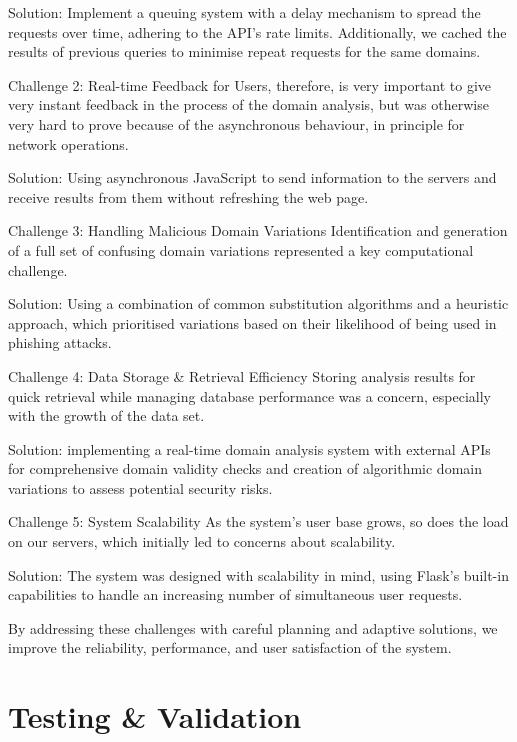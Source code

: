 Solution: Implement a queuing system with a delay mechanism to spread the requests over time, adhering to the API's rate limits. Additionally, we cached the results of previous queries to minimise repeat requests for the same domains.

Challenge 2: Real-time Feedback for Users, therefore, is very important to give very instant feedback in the process of the domain analysis, but was otherwise very hard to prove because of the asynchronous behaviour, in principle for network operations.

Solution: Using asynchronous JavaScript to send information to the servers and receive results from them without refreshing the web page. 

Challenge 3: Handling Malicious Domain Variations
Identification and generation of a full set of confusing domain variations represented a key computational challenge.

Solution: Using a combination of common substitution algorithms and a heuristic approach, which prioritised variations based on their likelihood of being used in phishing attacks. 

Challenge 4: Data Storage \& Retrieval Efficiency
Storing analysis results for quick retrieval while managing database performance was a concern, especially with the growth of the data set.

Solution: implementing a real-time domain analysis system with external APIs for comprehensive domain validity checks and creation of algorithmic domain variations to assess potential security risks. 
 
Challenge 5: System Scalability
As the system's user base grows, so does the load on our servers, which initially led to concerns about scalability.

Solution: The system was designed with scalability in mind, using Flask's built-in capabilities to handle an increasing number of simultaneous user requests. 

By addressing these challenges with careful planning and adaptive solutions, we improve the reliability, performance, and user satisfaction of the system.

\section{Testing \& Validation}

